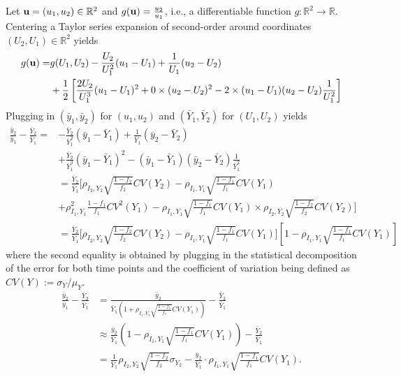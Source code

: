 \documentclass[11pt]{article}
\numberwithin{equation}{section}
\theoremstyle{plain}
\begin{document}
Let ${\bf u} = (u_1,u_2) \in \mathbb{R}^2$ and $g({\bf u}) = \frac{u_2}{u_1}$, i.e., a differentiable function $g:\mathbb{R}^2 \to \mathbb{R}$. Centering a Taylor series expansion of second-order around coordinates $(U_2, U_1) \in \mathbb{R}^2$ yields
$$
\begin{aligned}
g({\bf u}) =& g(U_1, U_2) - \frac{U_2}{U_1^2} (u_1 - U_1) + \frac{1}{U_1} (u_2 - U_2) \\
&+ \frac{1}{2} \left[ \frac{2 U_2}{U_1^3} (u_1 - U_1)^2 + 0 \times (u_2 - U_2)^2 - 2 \times (u_1 - U_1) (u_2 - U_2) \frac{1}{U_1^2} \right]
\end{aligned}
$$
Plugging in $(\bar y_1, \bar y_2)$ for $(u_1, u_2)$ and $(\bar Y_1, \bar Y_2)$ for $(U_1, U_2)$ yields
$$
\begin{aligned}
\frac{\bar y_2}{\bar y_1} - \frac{\bar Y_2}{\bar Y_1} =& - \frac{\bar Y_2}{\bar Y_1^2} (\bar y_1 - \bar Y_1) + \frac{1}{\bar Y_1} (\bar y_2 - \bar Y_2) \\
&+ \frac{\bar Y_2}{\bar Y_1^3} (\bar y_1 - \bar Y_1)^2 -  (\bar y_1 - \bar Y_1) (\bar y_2 - \bar Y_2) \frac{1}{\bar Y_1^2} \\
&= \frac{\bar Y_2}{\bar Y_1} \bigg[  \rho_{I_2,Y_2} \sqrt{\frac{1-f_2}{f_2}} CV (Y_2)  -\rho_{I_1,Y_1} \sqrt{\frac{1-f_1}{f_1}} CV (Y_1) \\
&+ \rho^2_{I_1,Y_1} \frac{1-f_1}{f_1} CV^2 (Y_1) -  \rho_{I_1,Y_1} \sqrt{\frac{1-f_1}{f_1}} CV (Y_1) \times \rho_{I_2,Y_2} \sqrt{\frac{1-f_2}{f_2}} CV (Y_2)   \bigg] \\
&= \frac{\bar Y_2}{\bar Y_1} \bigg[ \rho_{I_2,Y_2} \sqrt{\frac{1-f_2}{f_2}} CV (Y_2)  -\rho_{I_1,Y_1} \sqrt{\frac{1-f_1}{f_1}} CV (Y_1) \bigg] \left[ 1 - \rho_{I_1,Y_1} \sqrt{\frac{1-f_1}{f_1}} CV (Y_1) \right]
\end{aligned}
$$
where the second equality is obtained by plugging in the statistical decomposition of the error for both time points and the coefficient of variation being defined as $CV(Y) := \sigma_Y/\mu_Y$.
\newpage
$$
\begin{aligned}
\frac{\bar y_2}{\bar y_1} - \frac{\bar Y_2}{\bar Y_1}
&= \frac{\bar y_2}{\bar Y_1  \left(1 + \rho_{I_1,Y_1} \sqrt{\frac{1-f_1}{f_1}} CV (Y_1) \right) } - \frac{\bar Y_2}{\bar Y_1}  \\
&\approx \frac{\bar y_2}{\bar Y_1} \left(1 - \rho_{I_1,Y_1} \sqrt{\frac{1-f_1}{f_1}} CV (Y_1) \right) - \frac{\bar Y_2}{\bar Y_1} \\
&= \frac{1}{\bar Y_1}  \rho_{I_2, Y_2} \sqrt{\frac{1-f_2}{f_2}} \sigma_{Y_2} - \frac{\bar y_2}{\bar Y_1} \cdot \rho_{I_1,Y_1} \sqrt{\frac{1-f_1}{f_1}} CV (Y_1).
\end{aligned}
$$
\end{document}
